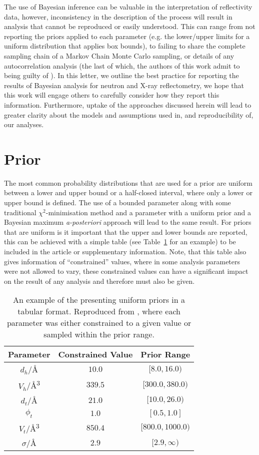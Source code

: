 \documentclass[reprint,superscriptaddress,aps,amsmath,linenumbers]{revtex4-2}
\begin{document}
The use of Bayesian inference can be valuable in the interpretation of reflectivity data, however, inconsistency in the description of the process will result in analysis that cannot be reproduced or easily understood. 
This can range from not reporting the priors applied to each parameter (e.g. the lower/upper limits for a uniform distribution that applies box bounds), to failing to share the complete sampling chain of a Markov Chain Monte Carlo sampling, or details of any autocorrelation analysis (the last of which, the authors of this work admit to being guilty of \cite{mccluskey_bayesian_2019}). 
In this letter, we outline the best practice for reporting the results of Bayesian analysis for neutron and X-ray reflectometry, we hope that this work will engage others to carefully consider how they report this information. 
Furthermore, uptake of the approaches discussed herein will lead to greater clarity about the models and assumptions used in, and reproducibility of, our analyses.

\section{Prior}
\label{sec:prior}

The most common probability distributions that are used for a prior are uniform between a lower and upper bound or a half-closed interval, where only a lower or upper bound is defined.
The use of a bounded parameter along with some traditional $\chi^2$-minimisation method and a parameter with a uniform prior and a Bayesian maximum \emph{a-posteriori} approach will lead to the same result. 
For priors that are uniform is it important that the upper and lower bounds are reported, this can be achieved with a simple table  (see Table~\ref{tab:bounds} for an example) to be included in the article or supplementary information. 
Note, that this table also gives information of ``constrained'' values, where in some analysis parameters were not allowed to vary, these constrained values can have a significant impact on the result of any analysis and therefore must also be given.
%
\begin{table}
    \caption{An example of the presenting uniform priors in a tabular format. Reproduced from \cite{mccluskey_general_2020}, where each parameter was either constrained to a given value or sampled within the prior range.}
    \label{tab:bounds}
    \begin{tabular}{c| c | c}
        Parameter & Constrained Value & Prior Range \\ 
        \hline
        $d_h$/\si{\angstrom} & $10.0$ & $[8.0, 16.0)$\\
        $V_h$/\si{\angstrom^3} & $339.5$ & $[300.0, 380.0)$\\
        $d_t$/\si{\angstrom} & $21.0$ & $[10.0, 26.0)$\\
        $\phi_t$ & $1.0$ & $[0.5, 1.0]$\\
        $V_t$/\si{\angstrom^3} & $850.4$ & $[800.0, 1000.0)$\\
        $\sigma$/\si{\angstrom} & $2.9$ & $[2.9, \infty)$\\
    \end{tabular}
\end{table}
%
\end{document}
